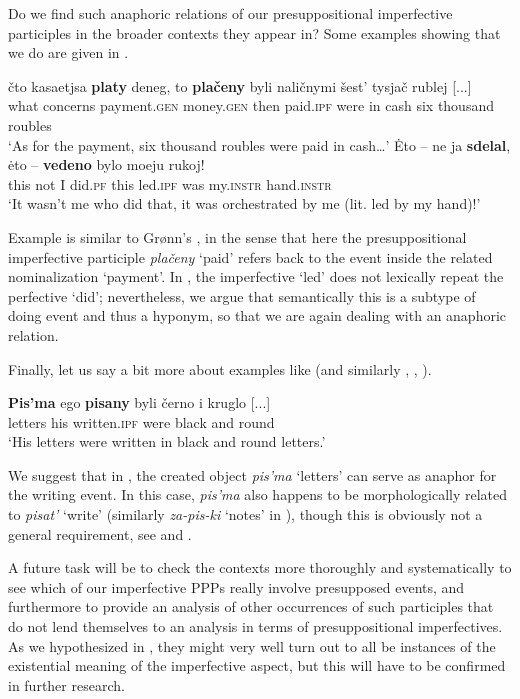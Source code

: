 \documentclass[output=paper,
modfonts,
newtxmath,
hidelinks
]{langscibook}
\begin{document}
Do we  find such anaphoric relations of our presuppositional imperfective participles in the broader contexts they appear in? Some examples showing that we do are given in .

\ea\label{anaphOF}
\ea\gll 	čto kasaetjsa \textbf{platy} deneg, to \textbf{plačeny} byli naličnymi šest' tysjač rublej [...]\\
	what concerns payment.\textsc{gen} money.\textsc{gen} then paid.\textsc{ipf} were {in cash} six thousand roubles\\
\glt	`As for the payment, six thousand roubles were paid in cash\dots'\label{platy}
\ex\gll 	\.{E}to -- ne ja \textbf{sdelal}, \.{e}to -- \textbf{vedeno} bylo moeju rukoj!\\
	this {} not I did.\textsc{pf} this {} led.\textsc{ipf} was my.\textsc{instr} hand.\textsc{instr}\\
\glt	`It wasn't me who did that, it was orchestrated by me (lit. led by my hand)!'\label{rukoj}	
\z\z

\noindent Example  is similar to Grønn's , in the sense that here the presuppositional imperfective participle \textit{plačeny} `paid' refers back to the event inside the related nominalization `payment'. In , the imperfective `led' does not lexically repeat the perfective `did'; nevertheless, we argue that semantically this is a subtype of doing event and thus a hyponym, so that we are again dealing with an anaphoric relation. 

Finally, let us say a bit more about examples like  (and similarly , , ). 

\ea\gll	\textbf{Pis'ma} ego \textbf{pisany} byli černo i kruglo [...]\\
	letters his written.\textsc{ipf} were black and round \\
\glt	`His letters were written in black and round letters.'\label{kruglo}
\z

\noindent We suggest that in , the created object \textit{pis'ma} `letters' can serve as anaphor for the writing event. In this case, \textit{pis'ma} also happens to be morphologically related to \textit{pisat'} `write' (similarly \textit{za-pis-ki} `notes' in ), though this is obviously not a general requirement, see   and .

A future task will be to check the contexts more thoroughly and systematically to see which of our imperfective PPPs really involve presupposed events, and furthermore to provide an analysis of other occurrences of such participles that do not lend themselves to an analysis in terms of presuppositional imperfectives. As we hypothesized in , they might very well turn out to all be instances of the existential meaning of the imperfective aspect, but this will have to be confirmed in further research.
\end{document}
